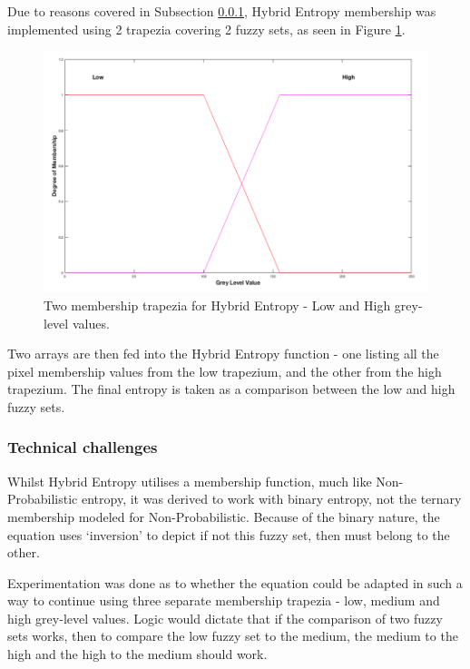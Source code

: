 Due to reasons covered in Subsection \ref{sssec:hyrid-technical}, Hybrid Entropy membership was implemented using 2 trapezia covering 2 fuzzy sets, as seen in Figure \ref{fig:2-traps}.

\begin{figure}[H]
  \center
  \includegraphics[scale=0.4]{Chapter2/hybrid-img/2_traps.png}
  \caption{Two membership trapezia for Hybrid Entropy - Low and High grey-level values.}
  \label{fig:2-traps}
\end{figure}

Two arrays are then fed into the Hybrid Entropy function - one listing all the pixel membership values from the low trapezium, and the other from the high trapezium. The final entropy is taken as a comparison between the low and high fuzzy sets.

\subsubsection{Technical challenges}
\label{sssec:hyrid-technical}

Whilst Hybrid Entropy utilises a membership function, much like Non-Probabilistic entropy, it was derived to work with binary entropy, not the ternary membership modeled for Non-Probabilistic. Because of the binary nature, the equation uses `inversion' to depict if not this fuzzy set, then must belong to the other.

Experimentation was done as to whether the equation could be adapted in such a way to continue using three separate membership trapezia - low, medium and high grey-level values. Logic would dictate that if the comparison of two fuzzy sets works, then to compare the low fuzzy set to the medium, the medium to the high and the high to the medium should work.

